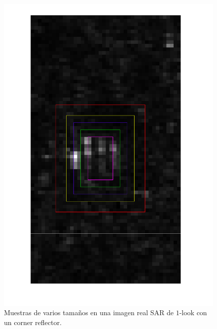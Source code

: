 \begin{figure}[htb]
	\centering
	\includegraphics[angle =90,width=.8\linewidth,]{../../Figures/Tesis/Capitulo6/CornerReg}
	\caption{\label{MuestrasCorner} Muestras de varios tamaños en una imagen real SAR de $1$-look con un corner reflector.}
\end{figure}

